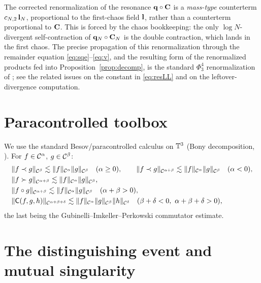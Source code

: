 \begin{remark}
The corrected renormalization of the resonance $\mathbf{q}\circ\mathbf{C}$ is a
\emph{mass-type} counterterm $c_{N,2}\,\mathbf{l}_N$, proportional to the first-chaos
field $\mathbf{l}$, rather than a counterterm proportional to $\mathbf{C}$. This is forced by
the chaos bookkeeping: the only $\log N$-divergent self-contraction of
$\mathbf{q}_N\circ\mathbf{C}_N$ is the double contraction, which lands in the first chaos. The
precise propagation of this renormalization through the remainder equation
\eqref{eq:sqe}--\eqref{eq:v}, and the resulting form of the renormalized products fed
into Proposition~\ref{prop:decomp}, is the standard $\Phi^4_3$ renormalization of
\cite{CC18,MW17b,EW24}; see the related issues on the constant in
\eqref{eq:resLL} and on the leftover-divergence computation.
\end{remark}

\section*{Paracontrolled toolbox}

We use the standard Besov/paracontrolled calculus on $\mathbb{T}^3$ (Bony decomposition,
\cite{BCD11,GIP15}). For $f\in\mathcal{C}^\alpha$, $g\in\mathcal{C}^\beta$:
\begin{align}
&\|f\prec g\|_{\qoneC^{\beta}}\lesssim\|f\|_{\qoneC^{\alpha}}\|g\|_{\qoneC^{\beta}}\quad(\alpha\ge 0),\qquad
\|f\prec g\|_{\qoneC^{\alpha+\beta}}\lesssim\|f\|_{\qoneC^{\alpha}}\|g\|_{\qoneC^{\beta}}\quad(\alpha<0),\label{eq:para1}\\
&\|f\succ g\|_{\qoneC^{\alpha+\beta}}\lesssim\|f\|_{\qoneC^{\alpha}}\|g\|_{\qoneC^{\beta}},\label{eq:para2}\\
&\|f\circ g\|_{\qoneC^{\alpha+\beta}}\lesssim\|f\|_{\qoneC^{\alpha}}\|g\|_{\qoneC^{\beta}}\quad(\alpha+\beta>0),\label{eq:res}\\
&\|\mathsf C(f,g,h)\|_{\qoneC^{\alpha+\beta+\delta}}\lesssim\|f\|_{\qoneC^{\alpha}}\|g\|_{\qoneC^{\beta}}\|h\|_{\qoneC^{\delta}}\quad(\beta+\delta<0,\ \alpha+\beta+\delta>0),\label{eq:comm}
\end{align}
the last being the Gubinelli--Imkeller--Perkowski commutator estimate.

\section*{The distinguishing event and mutual singularity}

